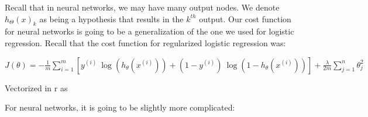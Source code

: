 \documentclass[
]{book}
\newenvironment{Shaded}{\begin{snugshade}}{\end{snugshade}}
\newcommand{\DecValTok}[1]{\textcolor[rgb]{0.00,0.00,0.81}{#1}}
\newcommand{\KeywordTok}[1]{\textcolor[rgb]{0.13,0.29,0.53}{\textbf{#1}}}
\newcommand{\NormalTok}[1]{#1}
\newcommand{\OperatorTok}[1]{\textcolor[rgb]{0.81,0.36,0.00}{\textbf{#1}}}
\newcommand{\StringTok}[1]{\textcolor[rgb]{0.31,0.60,0.02}{#1}}
\begin{document}
Recall that in neural networks, we may have many output nodes. We denote \(h_\Theta(x)_k\) as being a hypothesis that results in the \(k^{th}\) output. Our cost function for neural networks is going to be a generalization of the one we used for logistic regression. Recall that the cost function for regularized logistic regression was:

\(J(\theta) = - \frac{1}{m} \sum_{i=1}^m [ y^{(i)}\ \log (h_\theta (x^{(i)})) + (1 - y^{(i)})\ \log (1 - h_\theta(x^{(i)}))] + \frac{\lambda}{2m}\sum_{j=1}^n \theta_j^2\)

Vectorized in r as

\begin{Shaded}
\end{Shaded}

For neural networks, it is going to be slightly more complicated:
\end{document}
